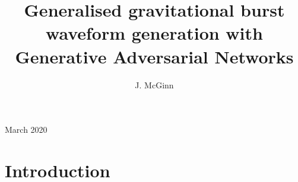 \documentclass[12pt]{iopart}
\begin{document}
\title{Generalised gravitational burst waveform generation with Generative Adversarial Networks}

\author{J. McGinn}

\address{University of Glasgow, Physics \& Astronomy Department, Glasgow G12 8QQ, UK}
\vspace{10pt}
\begin{indented}
\item[]March 2020
\end{indented}

\begin{abstract}

\end{abstract}

%
%
%
% 
%



\section{Introduction}

\end{document}

